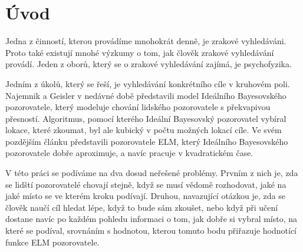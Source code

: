 \chapter*{Úvod}

Jedna z činností, kterou provádíme mnohokrát denně, je zrakové vyhledáváni.
Proto také existují mnohé výzkumy o tom, jak člověk zrakové vyhledávání
provádí. Jeden z oborů, který se o zrakové vyhledávání zajímá, je psychofyzika.

Jedním z úkolů, který se řeší, je vyhledávání konkrétního cíle v kruhovém poli.
Najemnik a Geisler \citeyearpar{Najemnik05} v nedávné době představili model
Ideálního Bayesovského pozorovatele, který modeluje chování lidského
pozorovatele s překvapivou přesností. Algoritmus, pomocí kterého Ideální
Bayesovský pozorovatel vybíral lokace, které zkoumat, byl ale kubický v počtu
možných lokací cíle. Ve svém pozdějším článku \citeyearpar{Najemnik09} 
představili pozorovatele ELM, který Ideálního Bayesovského pozorovatele dobře
aproximuje, a navíc pracuje v kvadratickém čase.

V této práci se podíváme na dva dosud neřešené problémy. Prvním z nich je, zda se lidští
pozorovatelé chovají stejně, když se musí vědomě rozhodovat, jaké na jaké místo
se ve kterém kroku podívají. Druhou, navazující otázkou je, zda se člověk naučí
cíl hledat lépe, když to bude sám zkoušet, nebo když při učení dostane navíc po každém pohledu
informaci o tom, jak dobře si vybral místo, na které se podíval, srovnáním s hodnotou, kterou
tomuto bodu přiřazuje hodnotící funkce ELM pozorovatele.


